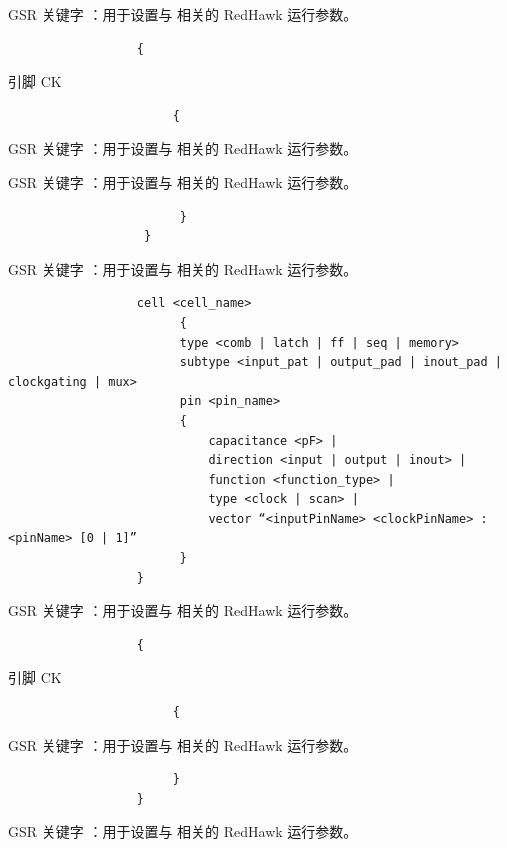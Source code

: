 GSR 关键字 ：用于设置与  相关的 RedHawk 运行参数。

\begin{lstlisting}
                  {
\end{lstlisting}

引脚 CK

\begin{lstlisting}
                       {
\end{lstlisting}

GSR 关键字 ：用于设置与  相关的 RedHawk 运行参数。

GSR 关键字 ：用于设置与  相关的 RedHawk 运行参数。

\begin{lstlisting}
                        }
                   }
\end{lstlisting}

GSR 关键字 ：用于设置与  相关的 RedHawk 运行参数。

\begin{lstlisting}
                  cell <cell_name>
                        {
                        type <comb | latch | ff | seq | memory>
                        subtype <input_pat | output_pad | inout_pad | clockgating | mux>
                        pin <pin_name>
                        {
                            capacitance <pF> |
                            direction <input | output | inout> |
                            function <function_type> |
                            type <clock | scan> |
                            vector “<inputPinName> <clockPinName> : <pinName> [0 | 1]”
                        }
                  }
\end{lstlisting}

GSR 关键字 ：用于设置与  相关的 RedHawk 运行参数。

\begin{lstlisting}
                  {
\end{lstlisting}

引脚 CK

\begin{lstlisting}
                       {
\end{lstlisting}

GSR 关键字 ：用于设置与  相关的 RedHawk 运行参数。

\begin{lstlisting}
                       }
                  }
\end{lstlisting}

GSR 关键字 ：用于设置与  相关的 RedHawk 运行参数。

